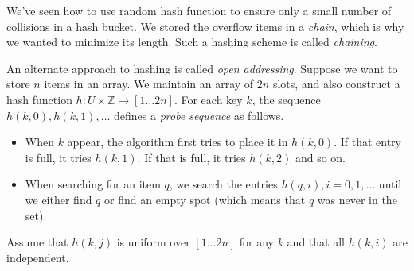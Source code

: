 \documentclass[addpoints]{exam}
\begin{document}
\begin{questions}
\begin{parts}
\end{parts}

We've seen how to use random hash function to ensure only a small number of
collisions in a hash bucket. We stored the overflow items in a \emph{chain},
which is why we wanted to minimize its length. Such a hashing scheme is called
\emph{chaining}. 

An alternate approach to hashing is called \emph{open addressing}. Suppose we
want to store $n$ items in an array. We maintain an array of $2n$ slots, and
also construct a hash function $h : U \times {\mathbb Z} \rightarrow [1\ldots
2n]$. For each key $k$, the sequence $h(k, 0), h(k, 1), \ldots$ defines a
\emph{probe sequence} as follows. 

\begin{itemize}
\item When $k$ appear, the algorithm first tries to place it in $h(k,0)$. If
  that entry is full, it tries $h(k, 1)$. If that is full, it tries $h(k, 2)$
  and so on.

\item   When searching for an item $q$, we search the entries
  $h(q, i), i = 0, 1, \ldots$ until we either find $q$ or find an empty spot
  (which means that $q$ was never in the set).
\end{itemize}

Assume that $h(k, j)$ is uniform over $[1\ldots 2n]$ for any $k$ and that all
$h(k, i)$ are independent. 

\end{questions}
\end{document}

